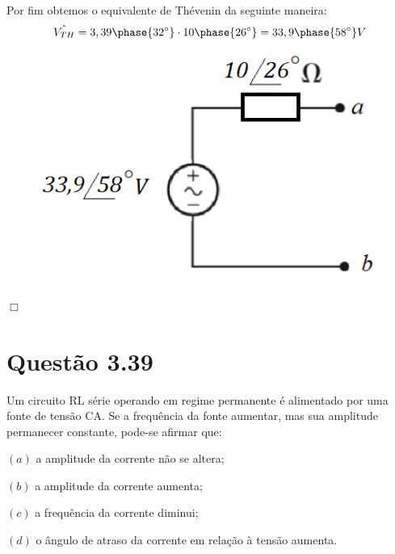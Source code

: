 \documentclass[
	12pt,				%
	oneside,			%
	a4paper,			%
	english,			%
	french,				%
	spanish,			%
	brazil				%
	]{abntex2}
\begin{document}
Por fim obtemos o equivalente de Thévenin da seguinte maneira:
$$\hat{V_{TH}} = 3,39\phase{32^{\circ}} \cdot 10\phase{26^{\circ}} = 33,9\phase{58^{\circ}} V$$

\begin{figure}[htb]
	\centering
	\includegraphics[scale=0.5]{3-35(f).PNG}
\end{figure}

\begin{flushright}
    $\Box$
\end{flushright}
\newpage

\section*{Questão 3.39}
Um circuito RL série operando em regime permanente é alimentado por uma fonte de tensão CA. Se a frequência da fonte aumentar, mas sua amplitude permanecer constante, pode-se afirmar que:


$(a)$ a amplitude da corrente não se altera; 

$(b)$ a amplitude da corrente aumenta;

$(c)$ a frequência da corrente diminui;

$(d)$ o ângulo de atraso da corrente em relação à tensão aumenta.
\end{document}
